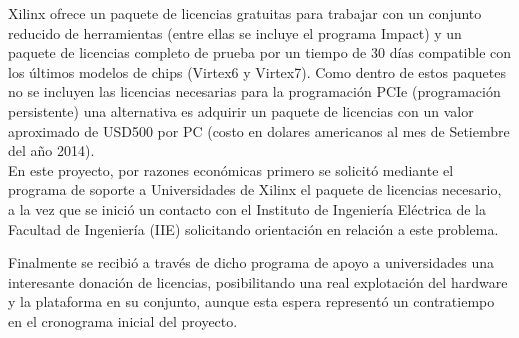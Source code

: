Xilinx ofrece un paquete de licencias gratuitas para trabajar con un conjunto reducido de herramientas (entre ellas se incluye el programa Impact) y un paquete de licencias completo de prueba por un tiempo de 30 d\'ias compatible con los \'ultimos modelos de chips (Virtex6 y Virtex7). Como dentro de estos paquetes no se incluyen las licencias necesarias para la programaci\'on PCIe (programaci\'on persistente) una alternativa es adquirir un paquete de licencias con un valor aproximado de USD500 por PC (costo en dolares americanos al mes de Setiembre del año 2014).\\




En este proyecto, por razones econ\'omicas primero se solicit\'o mediante el programa de soporte a Universidades de Xilinx el paquete de licencias necesario, a la vez que se inici\'o un contacto con el Instituto de Ingeniería Eléctrica de la Facultad de Ingeniería (IIE) solicitando orientación en relación a este problema. 

Finalmente se recibi\'o a través de dicho programa de apoyo a universidades una interesante donación de licencias, posibilitando una real explotación del hardware y la plataforma en su conjunto, aunque esta espera represent\'o un contratiempo en el cronograma inicial del proyecto. 

